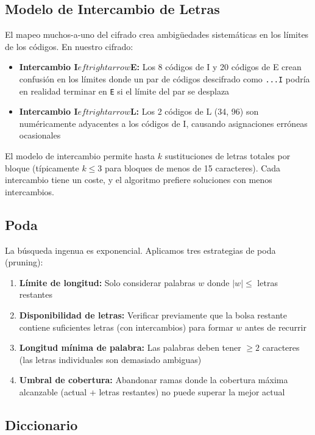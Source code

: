\documentclass[11pt,a4paper]{article}
\begin{document}
\subsection{Modelo de Intercambio de Letras}

El mapeo muchos-a-uno del cifrado crea ambigüedades sistemáticas en los límites de los códigos. En nuestro cifrado:

\begin{itemize}
\item \textbf{Intercambio I$eftrightarrow$E:} Los 8 códigos de I y 20 códigos de E crean confusión en los límites donde un par de códigos descifrado como \texttt{...I} podría en realidad terminar en \texttt{E} si el límite del par se desplaza
\item \textbf{Intercambio I$eftrightarrow$L:} Los 2 códigos de L (34, 96) son numéricamente adyacentes a los códigos de I, causando asignaciones erróneas ocasionales
\end{itemize}

El modelo de intercambio permite hasta $k$ sustituciones de letras totales por bloque (típicamente $k \leq 3$ para bloques de menos de 15 caracteres). Cada intercambio tiene un coste, y el algoritmo prefiere soluciones con menos intercambios.

\subsection{Poda}

La búsqueda ingenua es exponencial. Aplicamos tres estrategias de poda (pruning):

\begin{enumerate}
\item \textbf{Límite de longitud:} Solo considerar palabras $w$ donde $|w| \leq$ letras restantes
\item \textbf{Disponibilidad de letras:} Verificar previamente que la bolsa restante contiene suficientes letras (con intercambios) para formar $w$ antes de recurrir
\item \textbf{Longitud mínima de palabra:} Las palabras deben tener $\geq 2$ caracteres (las letras individuales son demasiado ambiguas)
\item \textbf{Umbral de cobertura:} Abandonar ramas donde la cobertura máxima alcanzable (actual + letras restantes) no puede superar la mejor actual
\end{enumerate}

\subsection{Diccionario}
\end{document}
